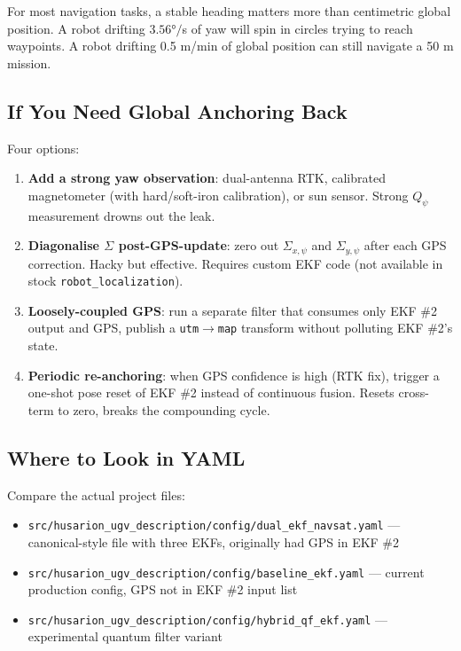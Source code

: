 \documentclass[11pt,a4paper]{article}
\begin{document}
For most navigation tasks, a stable heading matters more than centimetric global position. A robot drifting $3.56°/$s of yaw will spin in circles trying to reach waypoints. A robot drifting 0.5 m/min of global position can still navigate a 50 m mission.

\subsection{If You Need Global Anchoring Back}

Four options:

\begin{enumerate}
\item \textbf{Add a strong yaw observation}: dual-antenna RTK, calibrated magnetometer (with hard/soft-iron calibration), or sun sensor. Strong $Q_\psi$ measurement drowns out the leak.

\item \textbf{Diagonalise $\Sigma$ post-GPS-update}: zero out $\Sigma_{x,\psi}$ and $\Sigma_{y,\psi}$ after each GPS correction. Hacky but effective. Requires custom EKF code (not available in stock \texttt{robot\_localization}).

\item \textbf{Loosely-coupled GPS}: run a separate filter that consumes only EKF \#2 output and GPS, publish a \texttt{utm}$\to$\texttt{map} transform without polluting EKF \#2's state.

\item \textbf{Periodic re-anchoring}: when GPS confidence is high (RTK fix), trigger a one-shot pose reset of EKF \#2 instead of continuous fusion. Resets cross-term to zero, breaks the compounding cycle.
\end{enumerate}

\subsection{Where to Look in YAML}

Compare the actual project files:
\begin{itemize}
\item \texttt{src/husarion\_ugv\_description/config/dual\_ekf\_navsat.yaml} --- canonical-style file with three EKFs, originally had GPS in EKF \#2
\item \texttt{src/husarion\_ugv\_description/config/baseline\_ekf.yaml} --- current production config, GPS not in EKF \#2 input list
\item \texttt{src/husarion\_ugv\_description/config/hybrid\_qf\_ekf.yaml} --- experimental quantum filter variant
\end{itemize}
\end{document}
